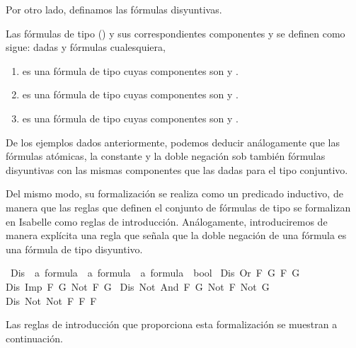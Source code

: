 \begin{isabellebody}
\begin{isamarkuptext}
  Por otro lado, definamos las fórmulas disyuntivas.

  \begin{definicion}
    Las fórmulas de tipo \isa{{\isasymbeta}} () y sus correspondientes componentes
     y  se definen como sigue: dadas  y  fórmulas cualesquiera,
    \begin{enumerate}
      \item {} es una fórmula de tipo \isa{{\isasymbeta}} cuyas componentes son  y .
      \item {} es una fórmula de tipo \isa{{\isasymbeta}} cuyas componentes son  y .
      \item {} es una fórmula de tipo \isa{{\isasymbeta}} cuyas componentes son  y .
    \end{enumerate} 
  \end{definicion}

  De los ejemplos dados anteriormente, podemos deducir análogamente que las fórmulas atómicas, la
  constante \isa{{\isasymbottom}} y la doble negación sob también fórmulas disyuntivas con las mismas componentes que
  las dadas para el tipo conjuntivo.

  Del mismo modo, su formalización se realiza como un predicado inductivo, de manera que las reglas 
  que definen el conjunto de fórmulas de tipo \isa{{\isasymbeta}} se formalizan en Isabelle como reglas de 
  introducción. Análogamente, introduciremos de manera explícita una regla que señala que la doble 
  negación de una fórmula es una fórmula de tipo disyuntivo.%
\end{isamarkuptext}\isamarkuptrue%
\isamarkupfalse%
\ Dis\ {\isacharcolon}{\isacharcolon}\ {\isachardoublequoteopen}{\isacharprime}a\ formula\ {\isacharequal}{\isachargreater}\ {\isacharprime}a\ formula\ {\isacharequal}{\isachargreater}\ {\isacharprime}a\ formula\ {\isacharequal}{\isachargreater}\ bool{\isachardoublequoteclose}\ \isanewline
{\isachardoublequoteopen}Dis\ {\isacharparenleft}Or\ F\ G{\isacharparenright}\ F\ G{\isachardoublequoteclose}\ {\isacharbar}\isanewline
{\isachardoublequoteopen}Dis\ {\isacharparenleft}Imp\ F\ G{\isacharparenright}\ {\isacharparenleft}Not\ F{\isacharparenright}\ G{\isachardoublequoteclose}\ {\isacharbar}\isanewline
{\isachardoublequoteopen}Dis\ {\isacharparenleft}Not\ {\isacharparenleft}And\ F\ G{\isacharparenright}{\isacharparenright}\ {\isacharparenleft}Not\ F{\isacharparenright}\ {\isacharparenleft}Not\ G{\isacharparenright}{\isachardoublequoteclose}\ {\isacharbar}\isanewline
{\isachardoublequoteopen}Dis\ {\isacharparenleft}Not\ {\isacharparenleft}Not\ F{\isacharparenright}{\isacharparenright}\ F\ F{\isachardoublequoteclose}%
\begin{isamarkuptext}%
Las reglas de introducción que proporciona esta formalización se muestran a continuación.


\end{isamarkuptext}
\end{isabellebody}

